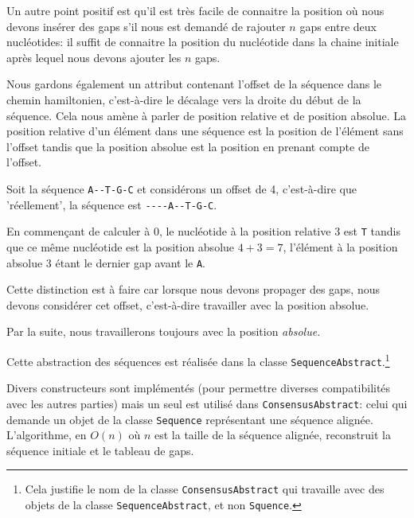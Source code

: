 Un autre point positif est qu'il est très facile de connaitre la position où nous
devons insérer des gaps s'il nous est demandé de rajouter $n$ gaps entre deux
nucléotides: il suffit de connaitre la position du nucléotide dans la chaine
initiale après lequel nous devons ajouter les $n$ gaps.

Nous gardons également un attribut contenant l'offset de la séquence dans le
chemin hamiltonien, c'est-à-dire le décalage vers la droite du début de la
séquence. Cela nous amène à parler de position relative et de position absolue.
La position relative d'un élément dans une séquence est la position de l'élément
sans l'offset tandis que la position absolue est la position en prenant compte
de l'offset.

\begin{exemple}
	Soit la séquence \verb|A--T-G-C| et considérons un offset de 4, c'est-à-dire
	que 'réellement', la séquence est \verb|----A--T-G-C|.

	En commençant de calculer à 0, le nucléotide à la position relative 3 est
	\verb|T| tandis que ce même nucléotide est la position absolue $4 + 3 = 7$,
	l'élément à la position absolue 3 étant le dernier gap avant le \verb|A|.
\end{exemple}

Cette distinction est à faire car lorsque nous devons propager des gaps, nous
devons considérer cet offset, c'est-à-dire travailler avec la position absolue.

Par la suite, nous travaillerons toujours avec la position \textit{absolue}.

Cette abstraction des séquences est réalisée dans la classe
\verb|SequenceAbstract|.\footnote{Cela justifie le nom de la classe
	\verb|ConsensusAbstract| qui travaille avec des objets de la classe
\verb|SequenceAbstract|, et non \verb|Squence|.}

Divers constructeurs sont implémentés (pour permettre diverses compatibilités
avec les autres parties) mais un seul est utilisé dans \verb|ConsensusAbstract|: celui qui
demande un objet de la classe \verb|Sequence| représentant une séquence alignée.
L'algorithme, en $O(n)$ où $n$ est la taille de la séquence alignée, reconstruit
la séquence initiale et le tableau de gaps.

